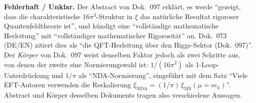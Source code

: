\smallskip\noindent\textbf{Fehlerhaft / Unklar.}\quad
Der Abstract von Dok.~097 erklärt, es werde \enquote{gezeigt, dass die
charakteristische $16\pi^3$-Struktur in $\xi$ das natürliche Resultat
rigoroser Quantenfeldtheorie ist}, und kündigt eine
\enquote{vollständige mathematische Herleitung} mit
\enquote{vollständiger mathematischer Rigorosität} an. Dok.~073 (DE/EN)
zitiert dies als \enquote{die QFT-Herleitung über den Higgs-Sektor
(Dok.~097)}. Der \emph{Körper} von Dok.~097 weist denselben Faktor
jedoch als zwei Schritte aus, von denen der zweite eine Normierungswahl
ist: $1/(16\pi^2)$ als 1-Loop-Unterdrückung und $1/\pi$ als
\enquote{NDA-Normierung}, eingeführt mit dem Satz \enquote{Viele
EFT-Autoren verwenden die Reskalierung
$\xi_\text{NDA} = (1/\pi)\,\xi_{\overline{\text{MS}}}(\mu = m_h)$}.
Abstract und Körper desselben Dokuments tragen also verschiedene
Aussagen.

